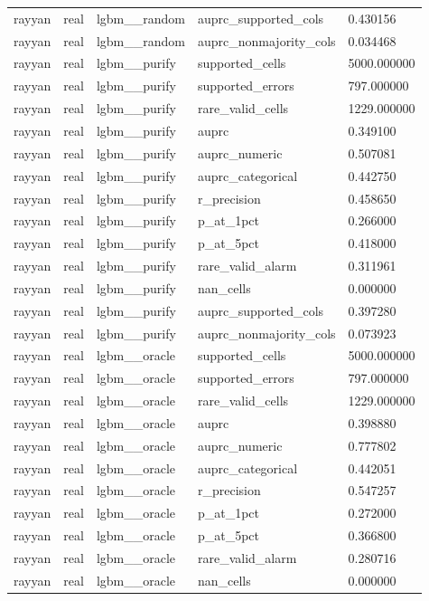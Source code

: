 \begin{tabular}{lllll}
rayyan & real & lgbm\_\_random & auprc\_supported\_cols & 0.430156 \\
rayyan & real & lgbm\_\_random & auprc\_nonmajority\_cols & 0.034468 \\
rayyan & real & lgbm\_\_purify & supported\_cells & 5000.000000 \\
rayyan & real & lgbm\_\_purify & supported\_errors & 797.000000 \\
rayyan & real & lgbm\_\_purify & rare\_valid\_cells & 1229.000000 \\
rayyan & real & lgbm\_\_purify & auprc & 0.349100 \\
rayyan & real & lgbm\_\_purify & auprc\_numeric & 0.507081 \\
rayyan & real & lgbm\_\_purify & auprc\_categorical & 0.442750 \\
rayyan & real & lgbm\_\_purify & r\_precision & 0.458650 \\
rayyan & real & lgbm\_\_purify & p\_at\_1pct & 0.266000 \\
rayyan & real & lgbm\_\_purify & p\_at\_5pct & 0.418000 \\
rayyan & real & lgbm\_\_purify & rare\_valid\_alarm & 0.311961 \\
rayyan & real & lgbm\_\_purify & nan\_cells & 0.000000 \\
rayyan & real & lgbm\_\_purify & auprc\_supported\_cols & 0.397280 \\
rayyan & real & lgbm\_\_purify & auprc\_nonmajority\_cols & 0.073923 \\
rayyan & real & lgbm\_\_oracle & supported\_cells & 5000.000000 \\
rayyan & real & lgbm\_\_oracle & supported\_errors & 797.000000 \\
rayyan & real & lgbm\_\_oracle & rare\_valid\_cells & 1229.000000 \\
rayyan & real & lgbm\_\_oracle & auprc & 0.398880 \\
rayyan & real & lgbm\_\_oracle & auprc\_numeric & 0.777802 \\
rayyan & real & lgbm\_\_oracle & auprc\_categorical & 0.442051 \\
rayyan & real & lgbm\_\_oracle & r\_precision & 0.547257 \\
rayyan & real & lgbm\_\_oracle & p\_at\_1pct & 0.272000 \\
rayyan & real & lgbm\_\_oracle & p\_at\_5pct & 0.366800 \\
rayyan & real & lgbm\_\_oracle & rare\_valid\_alarm & 0.280716 \\
rayyan & real & lgbm\_\_oracle & nan\_cells & 0.000000 \\

\end{tabular}
